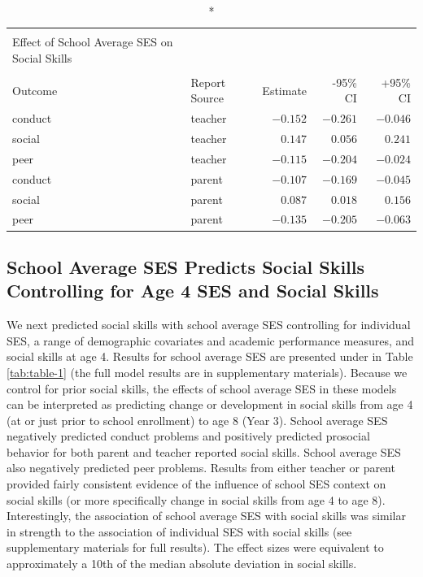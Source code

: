 \documentclass[
  english,
  man]{apa6}
\begin{document}
\captionsetup[table]{labelformat=empty,skip=1pt}
\begin{longtable}{llrrr}
\caption*{
\large Table 1\\ 
\small Effect of School Average SES on Social Skills\\ 
} \\ 
\toprule
Outcome & Report Source & Estimate & -95\% CI & +95\% CI \\ 
\midrule
conduct & teacher & $-0.152$ & $-0.261$ & $-0.046$ \\ 
social & teacher & $0.147$ & $0.056$ & $0.241$ \\ 
peer & teacher & $-0.115$ & $-0.204$ & $-0.024$ \\ 
conduct & parent & $-0.107$ & $-0.169$ & $-0.045$ \\ 
social & parent & $0.087$ & $0.018$ & $0.156$ \\ 
peer & parent & $-0.135$ & $-0.205$ & $-0.063$ \\ 
\bottomrule
\end{longtable}

\hypertarget{school-average-ses-predicts-social-skills-controlling-for-age-4-ses-and-social-skills}{%
\subsection{School Average SES Predicts Social Skills Controlling for Age 4 SES and Social Skills}\label{school-average-ses-predicts-social-skills-controlling-for-age-4-ses-and-social-skills}}

We next predicted social skills with school average SES controlling for individual SES, a range of demographic covariates and academic performance measures, and social skills at age 4. Results for school average SES are presented under in Table \ref{tab:table-1} (the full model results are in supplementary materials). Because we control for prior social skills, the effects of school average SES in these models can be interpreted as predicting change or development in social skills from age 4 (at or just prior to school enrollment) to age 8 (Year 3). School average SES negatively predicted conduct problems and positively predicted prosocial behavior for both parent and teacher reported social skills. School average SES also negatively predicted peer problems. Results from either teacher or parent provided fairly consistent evidence of the influence of school SES context on social skills (or more specifically change in social skills from age 4 to age 8). Interestingly, the association of school average SES with social skills was similar in strength to the association of individual SES with social skills (see supplementary materials for full results). The effect sizes were equivalent to approximately a 10th of the median absolute deviation in social skills.
\end{document}
